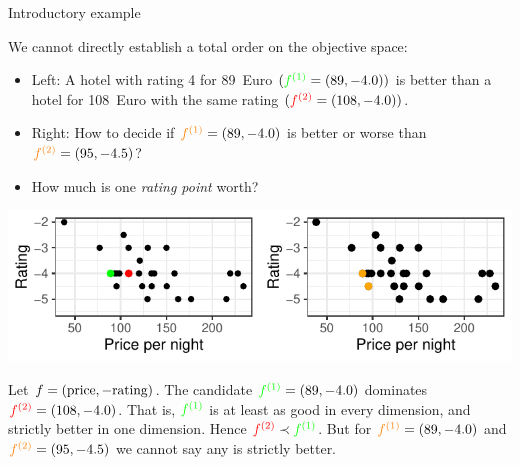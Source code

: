 \documentclass[11pt,compress,t,notes=noshow,xcolor=table]{beamer}
\begin{document}
\begin{vbframe}{Introductory example}
\framebreak

{\footnotesize
We cannot directly establish a total order on the objective space:
\begin{itemize}
  \item Left: A hotel with rating 4 for 89~Euro 
        \((\textcolor{green}{f^{(1)}} = (89, -4.0))\) 
        is better than a hotel for 108~Euro with the same rating
        \((\textcolor{red}{f^{(2)}} = (108, -4.0))\).
  \item Right: How to decide if 
        \(\textcolor{orange}{f^{(1)}}=(89, -4.0)\) is better or worse than 
        \(\textcolor{orange}{f^{(2)}}=(95, -4.5)\)?
  \item How much is one \emph{rating point} worth?
\end{itemize}

\begin{center}
\includegraphics[scale=1]{slides/11-multicrit/figure_man/expedia-2-1.pdf}
\end{center}

\vspace{-0.1cm}

Let \(f = (\text{price}, -\text{rating})\). The candidate 
\(\textcolor{green}{f^{(1)}}=(89,-4.0)\)
dominates 
\(\textcolor{red}{f^{(2)}}=(108,-4.0)\). 
That is, \(\textcolor{green}{f^{(1)}}\) is at least as good 
in every dimension, and strictly better in one dimension.
Hence $\textcolor{red}{f^{(2)}} \prec \textcolor{green}{f^{(1)}}$. But for
\(\textcolor{orange}{f^{(1)}}=(89,-4.0)\) and \(\textcolor{orange}{f^{(2)}}=(95,-4.5)\)
we cannot say any is strictly better.


}


\end{vbframe}
\end{document}
